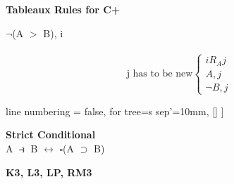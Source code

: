 \documentclass[12pt, fleqn]{article}
\begin{document}
\vspace{.5cm}
\textbf{Tableaux Rules for C+}\\
\begin{multicols}{2}
\hspace{2.8cm}$\neg$(A $>$ B), i\\
\hspace*{4.0cm}{\Large $\downarrow$}\\
\begin{equation*}
  \text{j has to be new}\begin{cases}
    iR_Aj&\\
    A,j\\
    \neg B, j
  \end{cases}
\end{equation*}

\begin{tableau}
  { line numbering = false,
  for tree={s sep'=10mm},
  }
[\bullet 
	[\neg A {,} i]
	[A {,} i
	  [iR_Ai]
	]
]
\end{tableau}
\end{multicols}

\vspace{.4cm}
\textbf{Strict Conditional\\}
A $\strictif$ B $\leftrightarrow$ $\square$(A $\supset$ B)

\pagebreak

\textbf{K3, L3, LP, RM3}\\
\end{document}
